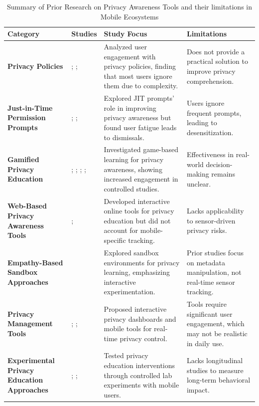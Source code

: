 \documentclass[acmlarge, nonacm]{acmart}
\begin{document}
\begin{table}[ht]
\centering
\begin{tabular}{|p{3cm}|p{3cm}|p{5cm}|p{4cm}|}
\hline
\textbf{Category} & \textbf{Studies} & \textbf{Study Focus} & \textbf{Limitations} \\ 
\hline
\textbf{Privacy Policies} & \citet{Obar2018The}; \citet{Korunovska2020TheCA}; \citet{burkhardt2023privacy} \citet{stellmacher2022escaping} & Analyzed user engagement with privacy policies, finding that most users ignore them due to complexity. & Does not provide a practical solution to improve privacy comprehension. \\
\hline
\textbf{Just-in-Time Permission Prompts} & \citet{Park2023Understanding}; \citet{Gruber2022Towards}; \citet{bilogrevic2021shhh} & Explored JIT prompts' role in improving privacy awareness but found user fatigue leads to dismissals. & Users ignore frequent prompts, leading to desensitization. \\
\hline
\textbf{Gamified Privacy Education} & \citet{Pahlavanpour2024gamified}; \cite{QUAYYUM2025100826}; \citet{dincelli2020choose}; \citet{stellmacher2022escaping}; \citet{idierukevbe2024bridging} & Investigated game-based learning for privacy awareness, showing increased engagement in controlled studies. & Effectiveness in real-world decision-making remains unclear. \\
\hline
\textbf{Web-Based Privacy Awareness Tools} & \citet{Hasrama2024Exploring}; \citet{bian2021supply} & Developed interactive online tools for privacy education but did not account for mobile-specific tracking. & Lacks applicability to sensor-driven privacy risks. \\
\hline
\textbf{Empathy-Based Sandbox Approaches} & \citet{Chaoran2023EmpathySandbox} & Explored sandbox environments for privacy learning, emphasizing interactive experimentation. & Prior studies focus on metadata manipulation, not real-time sensor tracking. \\
\hline
\textbf{Privacy Management Tools} & \citet{al-muhander2023}; \citet{Stephanidis2025}; \citet{narayanan2024real} & Proposed interactive privacy dashboards and mobile tools for real-time privacy control. & Tools require significant user engagement, which may not be realistic in daily use. \\
\hline
\textbf{Experimental Privacy Education Approaches} & \citet{Fleischhauer2022Paradox}; \citet{aly2024tailoring}; \citet{botturi2023school} & Tested privacy education interventions through controlled lab experiments with mobile users. & Lacks longitudinal studies to measure long-term behavioral impact. \\
\hline
\end{tabular}
\caption{Summary of Prior Research on Privacy Awareness Tools and their limitations in Mobile Ecosystems}
\label{tab:privacy_awareness}
\end{table}
\end{document}
